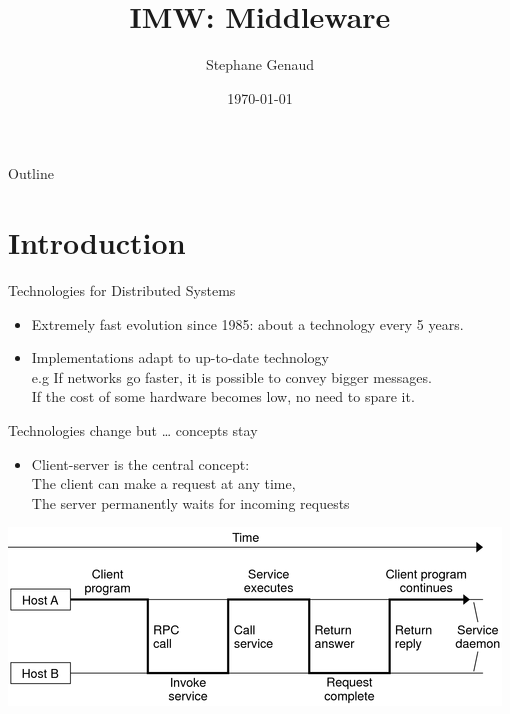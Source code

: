 \documentclass[bigger,hyperref={colorlinks=true, urlcolor=red, plainpages=false, pdfpagelabels, bookmarksnumbered}]{beamer}
\author{Stephane Genaud}
\date{\today}
\title{IMW: Middleware}
\begin{document}
\maketitle
\begin{frame}{Outline}
\setcounter{tocdepth}{1}
\tableofcontents
\end{frame}





\section{Introduction}
\label{sec-1}
\begin{frame}[label=sec-1-1]{Technologies for Distributed Systems}
\begin{itemize}
\item Extremely fast evolution since 1985:
about a technology every 5 years.\\
\item Implementations adapt to up-to-date technology\\
     e.g If networks go faster, it is possible to convey bigger messages.\\
         If the cost of some hardware becomes low, no need to spare it.
\end{itemize}
\end{frame}

\begin{frame}[label=sec-1-2]{Technologies change but \ldots{} concepts stay}
\begin{itemize}
\item Client-server is the central concept:\\
      The \alert{client} can make a request at any time,\\
      The \alert{server} permanently waits for incoming requests
\end{itemize}
\includegraphics[width=.9\linewidth]{./img/S9_RPC_works.png}
\end{frame}
\end{document}
